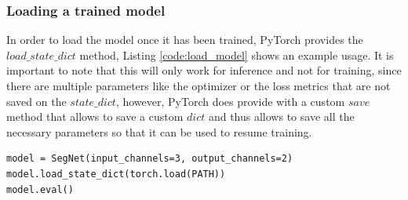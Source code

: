 \subsubsection{Loading a trained model}
In order to load the model once it has been trained, PyTorch provides the $load\_state\_dict$ method, Listing \ref{code:load_model} shows an example usage. It is important to note that this will only work for inference and not for training, since there are multiple parameters like the optimizer or the loss metrics that are not saved on the $state\_dict$, however, PyTorch does provide with a custom $save$ method that allows to save a custom $dict$ and thus allows to save all the necessary parameters so that it can be used to resume training.

\begin{lstlisting}[style=Python-color, caption=Load model checkpoint, frame=single, label=code:load_model]
model = SegNet(input_channels=3, output_channels=2)
model.load_state_dict(torch.load(PATH))
model.eval()

\end{lstlisting}